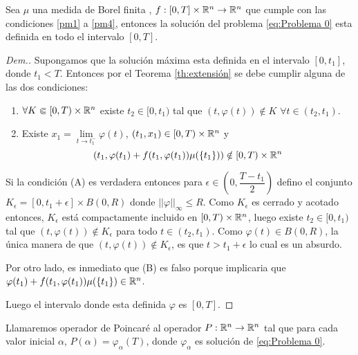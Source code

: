  
 \begin{thm}\label{th:P(T)}
 	Sea $\mu$ una medida de Borel finita , $f:[0,T]\times \mathbb{R}^n\to\mathbb{R}^n$ que cumple con las condiciones \ref{pm1}  a \ref{pm4},  entonces la solución del problema \ref{eq:Problema 0} esta definida en todo el intervalo $[0,T]$.
 \end{thm}
 \begin{proof}[Dem.]
 	Supongamos que la solución máxima esta definida en el intervalo $[0,t_1]$, donde $t_1< T$. Entonces por el Teorema  \ref{th:extensión} se debe cumplir alguna de las dos condiciones:
 	\begin{enumerate}
 		\item[A)] 	$\forall K\Subset [0,T)\times\mathbb{R}^n$ existe $t_2\in [0,t_1)$ tal que $(t,\varphi(t))\notin K$   $\forall t\in(t_2,t_1)$. 

        \item[B)] Existe $x_1=\lim\limits_{t\to t_1^-}\varphi(t)$,  $(t_1,x_1)\in[0,T)\times\mathbb{R}^n$ y  $$\left( t_1 , \varphi(t_1)+f(t_1,\varphi(t_1))\mu(\{t_1\})\right) \notin [0,T)\times\mathbb{R}^n$$
\end{enumerate}


   
 	Si la condición (A) es verdadera entonces para
 		$\epsilon\in\left( 0,\dfrac{T-t_1}{2}\right) $ defino el conjunto $K_{\epsilon}=[0,t_1+\epsilon]\times B(0,R)$ donde $||\varphi||_\infty\leq R$. Como $K_{\epsilon}$ es cerrado y acotado entonces, $K_{\epsilon}$ está compactamente incluido en $[0,T)\times\mathbb{R}^n$, luego existe $t_2\in [0,t_1)$ tal que $(t,\varphi(t))\notin K_{\epsilon}$ para todo $t\in(t_2,t_1)$. Como $\varphi(t)\in B(0,R)$, la única manera de que  $(t,\varphi(t))\notin K_{\epsilon}$, es que  $t>t_1+\epsilon$ lo cual es un absurdo.
   
   Por otro lado, es inmediato que  (B) es falso porque implicaria que  $\varphi(t_1)+f(t_1,\varphi(t_1))\mu(\{t_1\})\in\mathbb{R}^n$.
 	
 		

 Luego el intervalo donde esta definida $\varphi$ es $[0,T]$.
 \end{proof}


\begin{defi}
 Llamaremos operador de Poincaré  al operador $P:\mathbb{R}^n\to \mathbb{R}^n$ tal que para cada valor inicial $\alpha$, $P(\alpha)=\varphi_\alpha(T)$,  donde $\varphi_\alpha$ es solución de \ref{eq:Problema 0}.
\end{defi}

